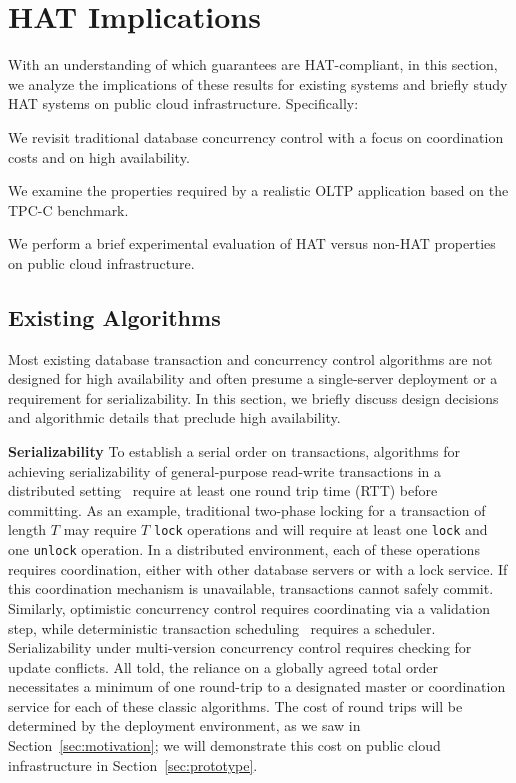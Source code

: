 
\section{HAT Implications}
\label{sec:evaluation}

With an understanding of which guarantees are HAT-compliant, in this
section, we analyze the implications of these results for existing
systems and briefly study HAT systems on public cloud
infrastructure. Specifically:

\begin{myenumerate}\vspace{-.5em}
\item We revisit traditional database concurrency control with a focus
  on coordination costs and on high availability.
\item We examine the properties required by a realistic OLTP
  application based on the TPC-C benchmark.
\item We perform a brief experimental evaluation of HAT versus non-HAT
  properties on public cloud infrastructure.
\end{myenumerate}

\subsection{Existing Algorithms}

Most existing database transaction and concurrency control algorithms
are not designed for high availability and often presume a
single-server deployment or a requirement for serializability. In this
section, we briefly discuss design decisions and algorithmic details
that preclude high availability.

\vspace{.5em}\noindent\textbf{Serializability} To establish a serial
order on transactions, algorithms for achieving serializability of
general-purpose read-write transactions in a distributed
setting~\cite{bernstein-book, davidson-survey, wisemann-survey}
require at least one round trip time (RTT) before committing. As an
example, traditional two-phase locking for a transaction of length $T$
may require $T$ \texttt{lock} operations and will require at least one
\texttt{lock} and one \texttt{unlock} operation.  In a distributed
environment, each of these operations requires coordination, either
with other database servers or with a lock service. If this
coordination mechanism is unavailable, transactions cannot safely
commit. Similarly, optimistic concurrency control requires
coordinating via a validation step, while deterministic transaction
scheduling~\cite{deterministic-scheduling} requires a
scheduler. Serializability under multi-version concurrency control
requires checking for update conflicts. All told, the reliance on a
globally agreed total order necessitates a minimum of one round-trip
to a designated master or coordination service for each of these
classic algorithms.  The cost of round trips will be determined by the
deployment environment, as we saw in Section~\ref{sec:motivation}; we
will demonstrate this cost on public cloud infrastructure in
Section~\ref{sec:prototype}.

